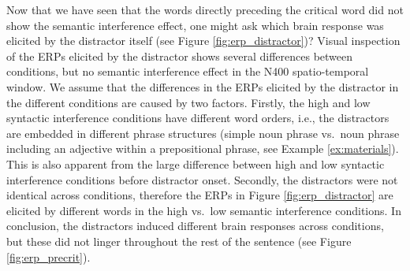 \documentclass[a4paper, man, floatsintext]{apa7}
\begin{document}
Now that we have seen that the words directly preceding the critical word did not show the semantic interference effect, one might ask which brain response was elicited by the distractor itself (see Figure \ref{fig:erp_distractor})? Visual inspection of the ERPs elicited by the distractor shows several differences between conditions, but no semantic interference effect in the N400 spatio-temporal window. We assume that the differences in the ERPs elicited by the distractor in the different conditions are caused by two factors. Firstly, the high and low syntactic interference conditions have different word orders, i.e., the distractors are embedded in different phrase structures (simple noun phrase vs.\ noun phrase including an adjective within a prepositional phrase, see Example \ref{ex:materials}). This is also apparent from the large difference between high and low syntactic interference conditions before distractor onset. Secondly, the distractors were not identical across conditions, therefore the ERPs in Figure \ref{fig:erp_distractor} are elicited by different words in the high vs.\ low semantic interference conditions. In conclusion, the distractors induced different brain responses across conditions, but these did not linger throughout the rest of the sentence (see Figure \ref{fig:erp_precrit}). %
\end{document}
